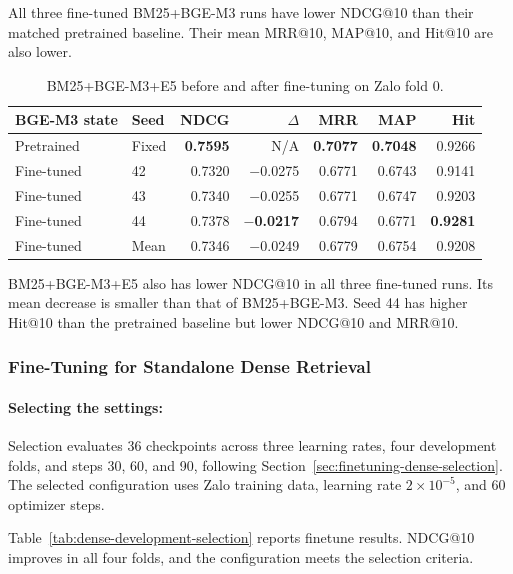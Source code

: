 All three fine-tuned BM25+BGE-M3 runs have lower NDCG@10 than their matched pretrained baseline. Their mean MRR@10, MAP@10, and Hit@10 are also lower.

\begin{table}[H]
\centering
\footnotesize
{}
\setlength{\tabcolsep}{5pt}
\renewcommand{\arraystretch}{1.05}
\caption{BM25+BGE-M3+E5 before and after fine-tuning on Zalo fold 0.}\label{tab:5.10}
\vspace{6pt}
\begin{tabular}{@{}llrrrrr@{}}
\toprule
\textbf{BGE-M3 state} & \textbf{Seed} & \textbf{NDCG} & \textbf{$\Delta$} & \textbf{MRR} & \textbf{MAP} & \textbf{Hit} \\
\midrule
Pretrained & Fixed & \textbf{0.7595} & N/A & \textbf{0.7077} & \textbf{0.7048} & 0.9266 \\
Fine-tuned & 42 & 0.7320 & \ensuremath{-}0.0275 & 0.6771 & 0.6743 & 0.9141 \\
Fine-tuned & 43 & 0.7340 & \ensuremath{-}0.0255 & 0.6771 & 0.6747 & 0.9203 \\
Fine-tuned & 44 & 0.7378 & \textbf{\ensuremath{-}0.0217} & 0.6794 & 0.6771 & \textbf{0.9281} \\
Fine-tuned & Mean & 0.7346 & \ensuremath{-}0.0249 & 0.6779 & 0.6754 & 0.9208 \\
\bottomrule
\end{tabular}
\end{table}

BM25+BGE-M3+E5 also has lower NDCG@10 in all three fine-tuned runs. Its mean decrease is smaller than that of BM25+BGE-M3. Seed 44 has higher Hit@10 than the pretrained baseline but lower NDCG@10 and MRR@10.


\subsubsection{Fine-Tuning for Standalone Dense Retrieval}
\paragraph{Selecting the settings:}

Selection evaluates 36 checkpoints across three learning rates, four development folds, and steps 30, 60, and 90, following Section~\ref{sec:finetuning-dense-selection}. The selected configuration uses Zalo training data, learning rate $2\times10^{-5}$, and 60 optimizer steps.

Table~\ref{tab:dense-development-selection} reports finetune results. NDCG@10 improves in all four folds, and the configuration meets the selection criteria.

